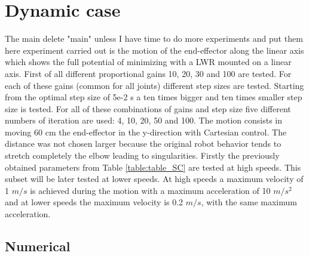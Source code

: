 \section{Dynamic case}
\label{sec:dynamic_case}



The  main {\color{red} delete "main" unless I have time to do more experiments and put them here} experiment carried out is the motion of the end-effector along the linear axis which shows the full potential of minimizing with a LWR mounted on a linear axis.
First of all different proportional gains 10, 20, 30 and 100 are tested. For each of these gains (common for all joints) different step sizes are tested. Starting from the optimal step size of 5e-2 s a ten times bigger and ten times smaller step size is tested. For all of these combinations of gains and step size five different numbers of iteration are used: 4, 10, 20, 50 and 100.
The motion consists in moving 60 cm the end-effector in the y-direction with Cartesian control.
The distance was not chosen larger because the original robot behavior tends to stretch completely the elbow leading to singularities. 
 Firstly the previously obtained  parameters from Table 	\ref{table:table_SC} are tested at high speeds. This subset will be later tested at lower speeds. At high speeds a maximum velocity of 1 $m/s$ is achieved during the motion with a maximum acceleration of 10 $m/s^{2}$ and at lower speeds the maximum velocity is 0.2 $m/s$, with the same maximum acceleration.





\subsection{Numerical}




